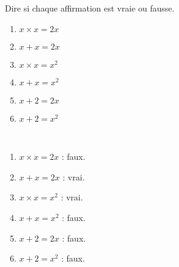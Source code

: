 \begin{exercice}
    Dire si chaque affirmation est vraie ou fausse.
    \begin{multicols}{2}
      \begin{enumerate}
         \item $x\times x = 2x$
         \item $x+x = 2x$
         \item $x\times x = x^{2}$
         \item $x+x =x^{2}$
         \item $x+2 =2x$
         \item $x+2=x^{2}$
      \end{enumerate}
   \end{multicols}
\end{exercice}
 
\begin{corrige}
 \ \\ [-5mm]
    \begin{enumerate}
       \item $x\times x = 2x$ : {\red faux}.
       \item $x+x = 2x$ : {\red vrai}.
       \item $x\times x = x^{2}$ : {\red vrai}.
       \item $x+x =x^{2}$ : {\red faux}.
       \item $x+2 =2x$ : {\red faux}.
       \item $x+2=x^{2}$ : {\red faux}.
    \end{enumerate}
\end{corrige}
